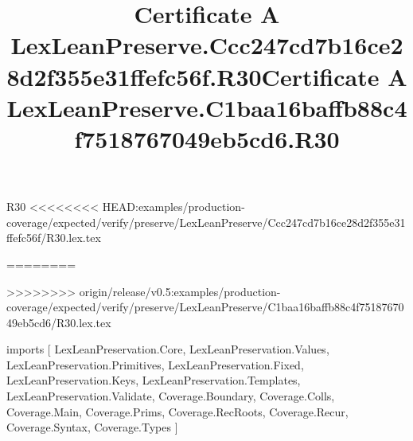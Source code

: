 \begin{lexlean}{R30}
<<<<<<<< HEAD:examples/production-coverage/expected/verify/preserve/LexLeanPreserve/Ccc247cd7b16ce28d2f355e31ffefc56f/R30.lex.tex
\title{Certificate A LexLeanPreserve.Ccc247cd7b16ce28d2f355e31ffefc56f.R30}
========
\title{Certificate A LexLeanPreserve.C1baa16baffb88c4f7518767049eb5cd6.R30}
>>>>>>>> origin/release/v0.5:examples/production-coverage/expected/verify/preserve/LexLeanPreserve/C1baa16baffb88c4f7518767049eb5cd6/R30.lex.tex
\begin{coremodule}
imports [
  LexLeanPreservation.Core,
  LexLeanPreservation.Values,
  LexLeanPreservation.Primitives,
  LexLeanPreservation.Fixed,
  LexLeanPreservation.Keys,
  LexLeanPreservation.Templates,
  LexLeanPreservation.Validate,
  Coverage.Boundary,
  Coverage.Colls,
  Coverage.Main,
  Coverage.Prims,
  Coverage.RecRoots,
  Coverage.Recur,
  Coverage.Syntax,
  Coverage.Types
]


\end{coremodule}
\end{lexlean}
